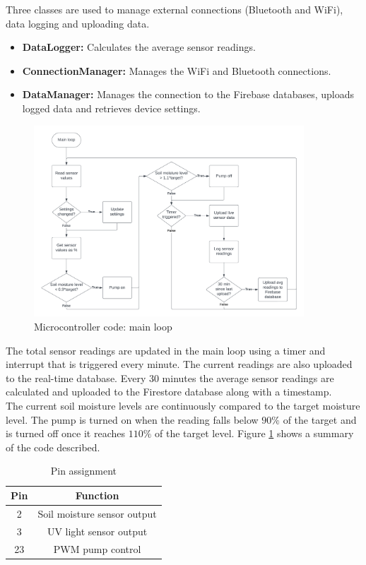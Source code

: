 Three classes are used to manage external connections (Bluetooth and WiFi), data logging and uploading data. 
\begin{itemize}
    \item \textbf{DataLogger:} Calculates the average sensor readings.
    \item \textbf{ConnectionManager:} Manages the WiFi and Bluetooth connections.
    \item \textbf{DataManager:} Manages the connection to the Firebase databases, uploads logged data and retrieves device settings.
\end{itemize}

\begin{figure}[!h]
    \centering
    \includegraphics[width= 0.9\textwidth]{Report/detail_design/fig/main_loop_flow.png}
    \caption{Microcontroller code: main loop}
    \label{fig:main_loop_flow}
\end{figure}

The total sensor readings are updated in the main loop using a timer and interrupt that is triggered every minute. The current readings are also uploaded to the real-time database. Every 30 minutes the average sensor readings are calculated and uploaded to the Firestore database along with a timestamp.
\\
The current soil moisture levels are continuously compared to the target moisture level. The pump is turned on when the reading falls below $90\%$ of the target and is turned off once it reaches $110\%$ of the target level. Figure \ref{fig:main_loop_flow} shows a summary of the code described.

\begin{table}[!h]
    \centering
    \begin{tabular}{|c|c|}
        \hline
        Pin & Function \\
        \hline
        2 & Soil moisture sensor output \\
        3 & UV light sensor output \\
        23 & PWM pump control \\
        \hline
    \end{tabular}
    \caption{Pin assignment}
    \label{tab:pin_assignment}
\end{table}

